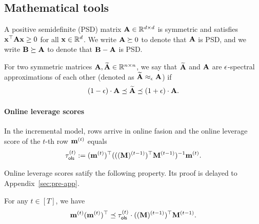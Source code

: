 \subsection{Mathematical tools}
\label{sec:basic_numerical_linear_algebra}

A positive semidefinite (PSD) matrix $\mathbf{A}\in \mathbb{R}^{d\times d}$ is symmetric and satisfies $\mathbf{x}^{\top}\mathbf{A}\mathbf{x}\geq 0$ for all $\mathbf{x}\in \mathbb{R}^{d}$.
We write $\mathbf{A} \succeq 0$ to denote that $\mathbf{A}$ is PSD, and we write $\mathbf{B} \succeq \mathbf{A}$ to denote that $\mathbf{B} - \mathbf{A}$ is PSD. 

\begin{definition}
For two symmetric matrices $\mathbf{A}, \widetilde{\mathbf{A}} \in \mathbb{R}^{n \times n}$, we say that $\widetilde{\mathbf{A}}$ and $\mathbf{A}$ are $\epsilon$-spectral approximations of each other (denoted as $\widetilde{\mathbf{A}} \approx_{\epsilon} \mathbf{A}$) if
\begin{align*}
    (1 - \epsilon) \cdot \mathbf{A} \preceq \widetilde{\mathbf{A}} \preceq (1 + \epsilon) \cdot \mathbf{A}.
\end{align*}
\end{definition}



\paragraph{Online leverage scores}  
In the incremental model, rows arrive in online fasion and the online leverage score of the $t$-th row $\mathbf{m}^{(t)}$ equals
\begin{align*}
    \tau_{\mathsf{ols}}^{(t)}:= (\mathbf{m}^{(t)})^\top (((\mathbf{M})^{(t-1)})^\top \mathbf{M}^{(t-1)})^{-1} \mathbf{m}^{(t)}.
\end{align*}


Online leverage scores satify the following property. Its proof is delayed to Appendix~\ref{sec:pre-app}.
\begin{fact}\label{fact:online_leverage_score}
For any $t\in [T]$, we have
\[
 \mathbf{m}^{(t)} (\mathbf{m}^{(t)})^{\top}  \preceq \tau_{\mathsf{ols}}^{(t)} \cdot  ((\mathbf{M})^{(t-1)})^\top \mathbf{M}^{(t-1)}.
\]
\end{fact}





